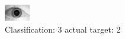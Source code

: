 \begin{figure}[h!]
\begin{center}
\includegraphics[width=0.60\columnwidth]{figures/ID1611_class_3_target_2.png}
\end{center}
\caption{ Classification: 3 actual target: 2}
\label{fig:ID1611_class_3_target_2}
\end{figure}
